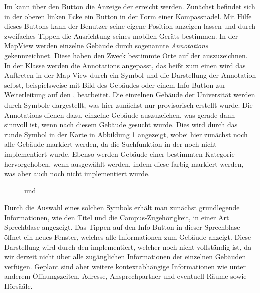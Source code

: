 \documentclass{report}
\begin{document}
Im  kann über den Button  die Anzeige der  erreicht werden. Zunächst befindet sich in der oberen linken Ecke ein Button in der Form einer Kompassnadel. Mit Hilfe dieses Buttons kann der Benutzer seine eigene Position anzeigen lassen und durch zweifaches Tippen die Ausrichtung seines mobilen Geräts bestimmen. In der MapView werden einzelne Gebäude durch sogenannte \emph{Annotations} gekennzeichnet. Diese haben den Zweck bestimmte Orte auf der  auszuzeichnen. In der Klasse  werden die Annotations angepasst, das heißt zum einen wird das Auftreten in der Map View durch ein Symbol und die Darstellung der Annotation selbst, beispielsweise mit Bild des Gebäudes oder einem Info-Button zur Weiterleitung auf den , bearbeitet. Die einzelnen Gebäude der Universität werden durch Symbole dargestellt, was hier zunächst nur provisorisch erstellt wurde. Die Annotations dienen dazu, einzelne Gebäude auszuzeichen, was gerade dann sinnvoll ist, wenn nach diesem Gebäude gesucht wurde. Dies wird durch das runde Symbol in der Karte in Abbildung \ref{bild_3} angezeigt, wobei hier zunächst noch alle Gebäude markiert werden, da die Suchfunktion in der  noch nicht implementiert wurde. Ebenso werden Gebäude einer bestimmten Kategorie hervorgehoben, wenn ausgewählt werden, indem diese farbig markiert werden, was aber auch noch nicht implementiert wurde.

\begin{figure}[ht]
\centering {}
\caption{ und }\label{bild_3}
\end{figure}

\noindent Durch die Auswahl eines solchen Symbols erhält man zunächst grundlegende Informationen, wie den Titel und die Campus-Zugehörigkeit, in einer Art Sprechblase angezeigt. Das Tippen auf den Info-Button in dieser Sprechblase öffnet ein neues Fenster, welches alle Informationen zum Gebäude anzeigt. Diese Darstellung wird durch den  implementiert, welcher noch nicht vollständig ist, da wir derzeit nicht über alle zugänglichen Informationen der einzelnen Gebäuden verfügen. Geplant sind aber weitere kontextabhängige Informationen wie unter anderem Öffnungszeiten, Adresse, Ansprechpartner und eventuell Räume sowie Hörsääle. 
\end{document}
